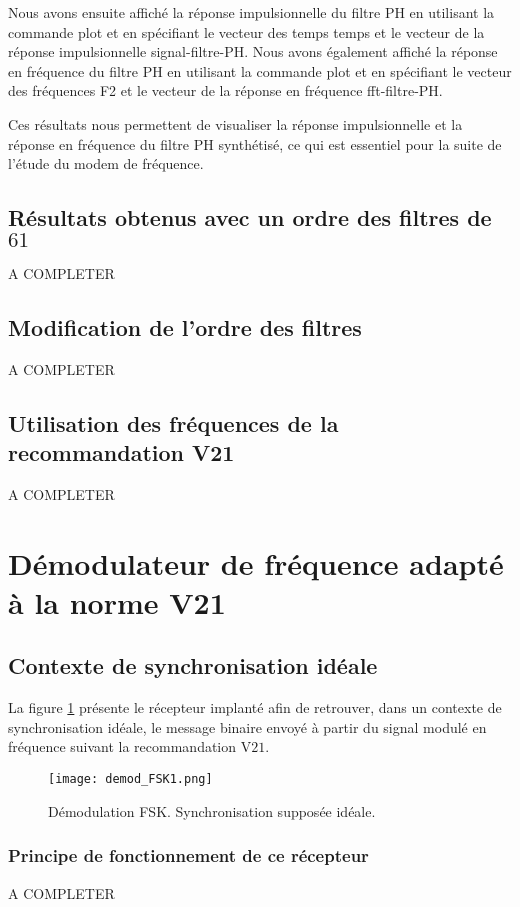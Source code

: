 \documentclass[frenchb]{article}
\begin{document}
\begin{itemize}
Nous avons ensuite affiché la réponse impulsionnelle du filtre PH en utilisant la commande plot et en spécifiant le vecteur des temps temps et le vecteur de la réponse impulsionnelle signal-filtre-PH. Nous avons également affiché la réponse en fréquence du filtre PH en utilisant la commande plot et en spécifiant le vecteur des fréquences F2 et le vecteur de la réponse en fréquence fft-filtre-PH.

Ces résultats nous permettent de visualiser la réponse impulsionnelle et la réponse en fréquence du filtre PH synthétisé, ce qui est essentiel pour la suite de l'étude du modem de fréquence.

        \subsection{Résultats obtenus avec un ordre des filtres de $61$}
        A COMPLETER

        \subsection{Modification de l'ordre des filtres}
        A COMPLETER
        
        \subsection{Utilisation des fréquences de la recommandation V21}
        A COMPLETER
        
\section{Démodulateur de fréquence adapté à la norme V21}
    \subsection{Contexte de synchronisation idéale}
    La figure \ref{fig : demod_FSK} présente le récepteur implanté afin de retrouver, dans un contexte de synchronisation idéale, le message binaire envoyé à partir du signal modulé en fréquence suivant la recommandation V$21$.   
    \begin{figure}[ht!]
        \centering
        \texttt{[image: demod\_FSK1.png]}
        \caption{Démodulation FSK. Synchronisation supposée idéale. \label{fig : demod_FSK}}
     \end{figure}

    \subsubsection{Principe de fonctionnement de ce récepteur}
    A COMPLETER
    

\end{itemize}
\end{document}
